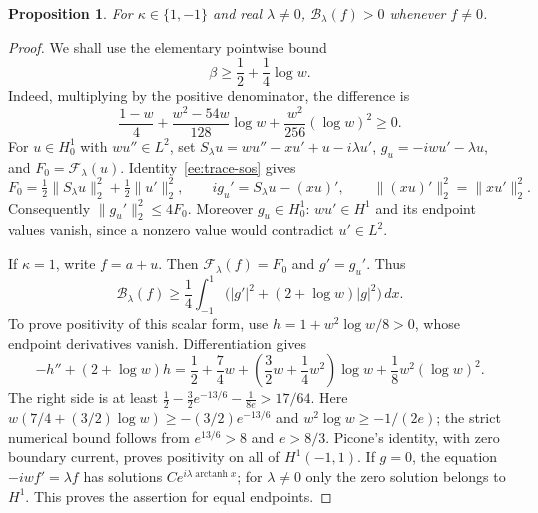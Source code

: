 \documentclass[reqno,11pt]{amsart}
\numberwithin{equation}{section}
\newtheorem{proposition}[theorem]{Proposition}
\theoremstyle{remark}
\begin{document}
\begin{proposition}\label{prop:corrected-trace}
For $\kappa\in\{1,-1\}$ and real $\lambda\ne0$,
$\mathcal B_\lambda(f)>0$ whenever $f\ne0$.
\end{proposition}
\begin{proof}
We shall use the elementary pointwise bound
\begin{equation}\label{eq:beta-lower}
 \beta\geq\frac12+\frac14\log w.
\end{equation}
Indeed, multiplying by the positive denominator, the difference is
\[
 \frac{1-w}{4}+\frac{w^2-54w}{128}\log w
                              +\frac{w^2}{256}(\log w)^2\geq0.
\]
For $u\in H^1_0$ with $wu''\in L^2$, set
$S_\lambda u=wu''-xu'+u-i\lambda u'$, $g_u=-iwu'-\lambda u$, and
$F_0=\mathcal F_\lambda(u)$. Identity~\eqref{ee:trace-sos} gives
\[
 F_0=\tfrac12\|S_\lambda u\|_2^2+\tfrac12\|u'\|_2^2,
 \qquad ig_u'=S_\lambda u-(xu)',
 \qquad \|(xu)'\|_2^2=\|xu'\|_2^2.
\]
Consequently $\|g_u'\|_2^2\leq4F_0$.
Moreover $g_u\in H^1_0$: $wu'\in H^1$ and its endpoint values
vanish, since a nonzero value would contradict $u'\in L^2$.

If $\kappa=1$, write $f=a+u$. Then
$\mathcal F_\lambda(f)=F_0$ and $g'=g_u'$. Thus
\[
 \mathcal B_\lambda(f)\geq\frac14\int_{-1}^1
              \bigl(|g'|^2+(2+\log w)|g|^2\bigr)\,dx.
\]
To prove positivity of this scalar form, use
$h=1+w^2\log w/8>0$, whose endpoint
derivatives vanish. Differentiation gives
\[
 -h''+(2+\log w)h
 =\frac12+\frac74w+
       \left(\frac32w+\frac14w^2\right)\log w
                         +\frac18w^2(\log w)^2.
\]
The right side is at least
$\frac12-\frac32e^{-13/6}-\frac1{8e}>17/64$.
Here $w(7/4+(3/2)\log w)\geq-(3/2)e^{-13/6}$ and
$w^2\log w\geq-1/(2e)$; the strict numerical bound follows
from $e^{13/6}>8$ and $e>8/3$.
Picone's identity, with zero boundary current, proves positivity
on all of $H^1(-1,1)$. If $g=0$, the equation
$-iwf'=\lambda f$ has solutions
$Ce^{i\lambda\operatorname{arctanh}x}$; for $\lambda\ne0$
only the zero solution belongs to $H^1$. This proves the assertion
for equal endpoints.


\end{proof}
\end{document}
